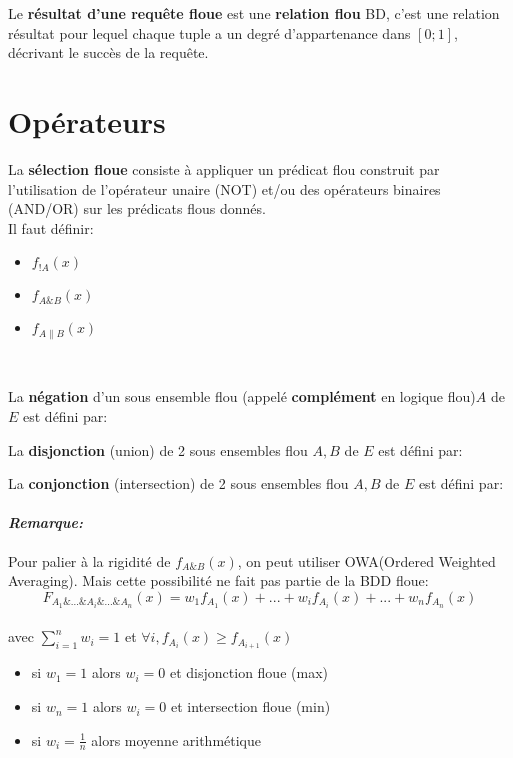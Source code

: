 \documentclass[a4paper,11pt]{article}
\begin{document}
Le \textbf{résultat d'une requête floue} est une \textbf{relation flou} BD, c'est une relation résultat pour lequel chaque tuple a un degré d'appartenance dans $[0;1]$, décrivant le succès de la requête.

\section{Opérateurs}
La \textbf{sélection floue} consiste à appliquer un prédicat flou construit par l’utilisation de l'opérateur unaire (NOT) et/ou des opérateurs binaires (AND/OR) sur les prédicats flous donnés.\\

Il faut définir:
\begin{itemize}
	\item$f_{!A}(x)$	
	\item$f_{A\&B}(x)$
	\item$f_{A\|B}(x)$
\end{itemize} 
~

La \textbf{négation} d'un sous ensemble flou (appelé \textbf{complément} en logique flou)$A$ de $E$ est défini par: \begin{center}  \end{center}

La \textbf{disjonction} (union) de 2 sous ensembles flou $A,B$ de $E$ est défini par: \begin{center}  \end{center}

La \textbf{conjonction} (intersection) de 2 sous ensembles flou $A,B$ de $E$ est défini par: \begin{center}  \end{center}

\paragraph{\emph{Remarque:}}
Pour palier à la rigidité de $f_{A\&B}(x)$, on peut utiliser OWA(Ordered Weighted Averaging). Mais cette possibilité ne fait pas partie de la BDD floue:
$$ F_{A_1\&...\&A_i\&...\&A_n}(x)=w_1f_{A_1}(x)+...+w_if_{A_i}(x)+...+w_nf_{A_n}(x)$$
\\

avec $\sum_{i=1}^{n} w_i=1$ et $\forall i,f_{A_i}(x)\geq f_{A_{i+1}}(x)$

\begin{itemize}
	\item si $w_1=1$ alors $w_i=0$ et disjonction floue (max)
	\item si $w_n=1$ alors $w_i=0$ et intersection floue (min)
	\item si $w_i=\frac{1}{n}$ alors moyenne arithmétique
\end{itemize}
\end{document}
